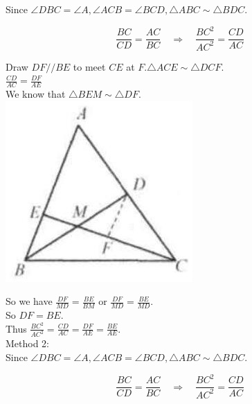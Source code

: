 \documentclass[10pt]{article}
\begin{document}
Since \(\angle D B C=\angle A, \angle A C B=\angle B C D, \triangle A B C \sim \triangle B D C\).

\[
\frac{B C}{C D}=\frac{A C}{B C} \quad \Rightarrow \quad \frac{B C^{2}}{A C^{2}}=\frac{C D}{A C}
\]

Draw \(D F / / B E\) to meet \(C E\) at \(F . \triangle A C E \sim \triangle D C F\).\\
\(\frac{C D}{A C}=\frac{D F}{A E}\)\\
We know that \(\triangle B E M \sim \triangle D F\).\\
\includegraphics[max width=\textwidth, center]{2025_04_17_97bc1f7e44d93c271a88g-115(1)}

So we have \(\frac{D F}{M D}=\frac{B E}{B M}\) or \(\frac{D F}{M D}=\frac{B E}{M D}\).\\
So \(D F=B E\).\\
Thus \(\frac{B C^{2}}{A C^{2}}=\frac{C D}{A C}=\frac{D F}{A E}=\frac{B E}{A E}\).\\
Method 2:\\
Since \(\angle D B C=\angle A, \angle A C B=\angle B C D, \triangle A B C \sim \triangle B D C\).

\[
\frac{B C}{C D}=\frac{A C}{B C} \quad \Rightarrow \quad \frac{B C^{2}}{A C^{2}}=\frac{C D}{A C}
\]
\end{document}
